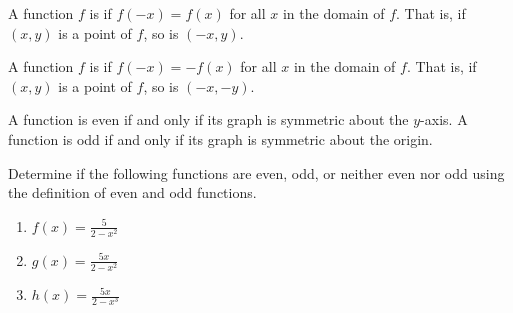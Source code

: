 \documentclass[nooutcomes]{ximera}
\begin{document}
\begin{definition}

A function $f$ is  if $f(-x) = f(x)$ for all $x$ in the domain of $f$. That is, if $(x,y)$ is a point of $f$, so is $(-x,y)$.



\end{definition}

\begin{definition}

A function $f$ is  if $f(-x) = -f(x)$ for all $x$ in the domain of $f$. That is, if $(x,y)$ is a point of $f$, so is $(-x,-y)$.

\end{definition}

A function is even if and only if its graph is symmetric about the $y$-axis.  A function is odd if and only if its graph is symmetric about the origin.  

\begin{example}
Determine if the following functions are even, odd, or neither even nor odd using the definition of even and odd functions. 
\begin{enumerate}
\item $f(x) = \frac{5}{2 - x^2}$ 
\item $g(x) = \frac{5x}{2 - x^2}$ 
\item $h(x) = \frac{5x}{2 - x^3}$
\end{enumerate}
\end{example}
\end{document}
